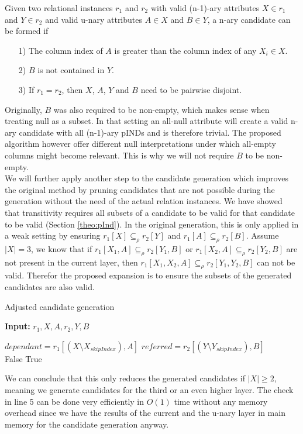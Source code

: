 \noindent Given two relational instances $r_1$ and $r_2$ with valid (n-1)-ary attributes $X \in r_1$ and $Y \in r_2$ and valid u-nary attributes $A \in X$ and $B \in Y$, a n-ary candidate can be formed if
\begin{itemize}
    \item[1)] The column index of $A$ is greater than the column index of any $X_i \in X$.
    \item[2)] $B$ is not contained in $Y$.
    \item[3)] If $r_1 = r_2$, then $X$, $A$, $Y$ and $B$ need to be pairwise disjoint.
\end{itemize}
Originally, $B$ was also required to be non-empty, which makes sense when treating null as a subset. In that setting an all-null attribute will create a valid n-ary candidate with all (n-1)-ary pINDs and is therefore trivial. The proposed algorithm however offer different null interpretations under which all-empty columns might become relevant. This is why we will not require $B$ to be non-empty. \\

\noindent We will further apply another step to the candidate generation which improves the original method by pruning candidates that are not possible during the generation without the need of the actual relation instances. We have showed that transitivity requires all subsets of a candidate to be valid for that candidate to be valid (Section \ref{theo:pInd}). In the original generation, this is only applied in a weak setting by ensuring $r_1[X] \subseteq_\rho r_2[Y]$ and $r_1[A] \subseteq_\rho r_2[B]$. Assume $|X| = 3$, we know that if $r_1[X_1, A] \subseteq_\rho r_2[Y_1, B]$ or $r_1[X_2, A] \subseteq_\rho r_2[Y_2, B]$ are not present in the current layer, then $r_1[X_1, X_2, A] \subseteq_\rho r_2[Y_1, Y_2, B]$ can not be valid. Therefor the proposed expansion is to ensure the subsets of the generated candidates are also valid.
\begin{algorithm}
    \caption{Adjusted candidate generation}\label{alg:canditate_gen}
    \hspace*{\algorithmicindent} \textbf{Input:} $r_1, X, A, r_2, Y, B$
    \begin{algorithmic}[1]
        \State $dependant = r_1[(X \setminus X_{skipIndex}), A]$
        \State $referred = r_2[(Y \setminus Y_{skipIndex}), B]$ \\
            \State \Return False
        \EndIf
    \EndFor
    \State \Return True
    \end{algorithmic}
\end{algorithm}

\noindent We can conclude that this only reduces the generated candidates if $|X| \geq 2$, meaning we generate candidates for the third or an even higher layer. The check in line 5 can be done very efficiently in $O(1)$ time without any memory overhead since we have the results of the current and the u-nary layer in main memory for the candidate generation anyway.